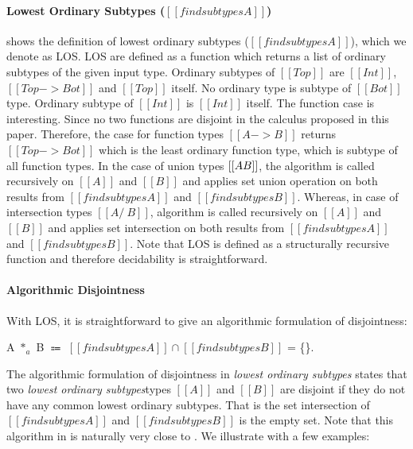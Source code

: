 \paragraph{Lowest Ordinary Subtypes ($[[findsubtypes A]]$)}
 shows the definition of
lowest ordinary subtypes ($[[findsubtypes A]]$), which we denote as LOS.
LOS are defined as a function which
returns a list of ordinary subtypes of the given input type.  Ordinary
subtypes of $[[Top]]$ are $[[Int]]$, $[[Top -> Bot]]$ and $[[Top]]$
itself. No ordinary type is subtype of $[[Bot]]$ type. Ordinary
subtype of $[[Int]]$ is $[[Int]]$ itself. The function case is
interesting. Since no two functions are disjoint in the calculus
proposed in this paper.
Therefore, the case for function types $[[A -> B]]$ returns $[[Top
    -> Bot]]$ which is the least ordinary function type, which is subtype
of all function types. In the case of union types $[[A \/ B]]$, the
algorithm is called recursively on $[[A]]$ and $[[B]]$ and applies set union
operation on both results from $[[findsubtypes A]]$ and
$[[findsubtypes B]]$. Whereas, in case of intersection types $[[A
    /\ B]]$, algorithm is called recursively on $[[A]]$ and $[[B]]$
and applies set intersection on both results from
$[[findsubtypes A]]$ and $[[findsubtypes B]]$.
Note that LOS is defined as a structurally recursive function and therefore
decidability is straightforward.

\paragraph{Algorithmic Disjointness}
With LOS, it is straightforward to give an algorithmic formulation of
disjointness:

\begin{definition}
\label{def:inter:ad}
  A $*_a$ B $\Coloneqq$  $ [[findsubtypes A]] \cap [[findsubtypes B]] $ = \{\}.
\end{definition}

\noindent The algorithmic formulation of disjointness in
\emph{lowest ordinary subtypes} states that two
\emph{lowest ordinary subtypes}types
$[[A]]$ and $[[B]]$ are disjoint
if they do not have any common lowest ordinary subtypes. That is the
set intersection of $[[findsubtypes A]]$ and $[[findsubtypes B]]$ is the empty set.
Note that this algorithm in  is naturally very close to .
We illustrate  with a few examples:

